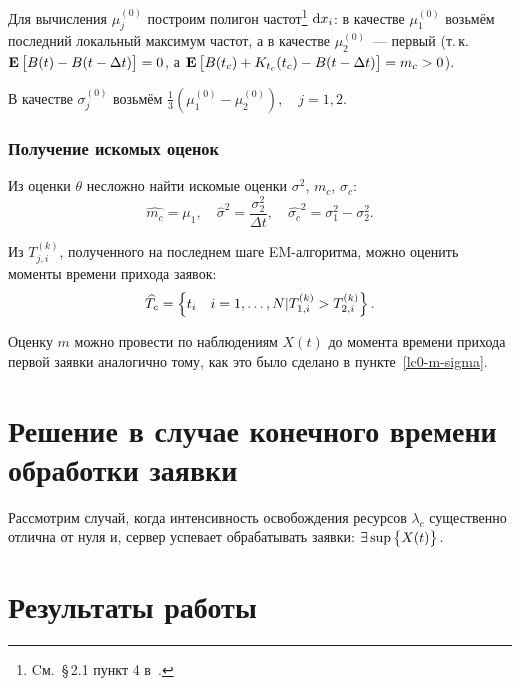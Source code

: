 \documentclass[a4paper,10pt]{article}
\begin{document}
Для вычисления $\mu_j^{(0)}$ построим полигон частот\footnote{%
Cм.~\S\,2.1 пункт 4 в~\cite{ivchmed2010matstat}.
} $\dif x_i$:
в качестве $\mu_1^{(0)}$ возьмём последний локальный максимум частот, 
а в качестве $\mu_2^{(0)}$~--- первый
(т.\,к.~$\mathbf{E}\sbr{B(t) - B(t - \Delta t)} = 0$, 
а $\mathbf{E}\sbr{B(t_c) + K_{t_c}(t_c) - B(t - \Delta t)} = m_c > 0$).

В качестве $\sigma_j^{(0)}$ возьмём $\frac{1}{3}(\mu_1^{(0)} - \mu_2^{(0)}), 
\quad j=1, 2$.

\subsubsection{Получение искомых оценок}
Из оценки $\theta$ несложно найти искомые оценки 
$\sigma^2$, $m_c$, $\sigma_c$:
$$
  \widehat{m_c} = \mu_1, \quad 
  \widehat{\sigma}^2 = \frac{\sigma_2^2}{\Delta t}, \quad
  \widehat{\sigma_c}^2 = \sigma_1^2 - \sigma_2^2.
$$

Из $T_{j,i}^{(k)}$, полученного на последнем шаге EM-алгоритма, можно оценить
моменты времени прихода заявок:
$$\widehat{T_c} = \cbr{t_i \quad i=1,\ldots,N \vert 
    T_{1,i}^{(k)} > T_{2,i}^{(k)}}.$$

Оценку $m$ можно провести по наблюдениям $X(t)$ до момента времени прихода
первой заявки аналогично тому, как это было сделано в пункте~\ref{lc0-m-sigma}.

\section{Решение в случае конечного времени обработки заявки}
Рассмотрим случай, когда интенсивность освобождения ресурсов $\lambda_c$ 
существенно отлична от нуля и,
сервер успевает обрабатывать заявки: $\exists \sup\cbr{X(t)}$.

\section{Результаты работы}




\pagebreak



\end{document}
